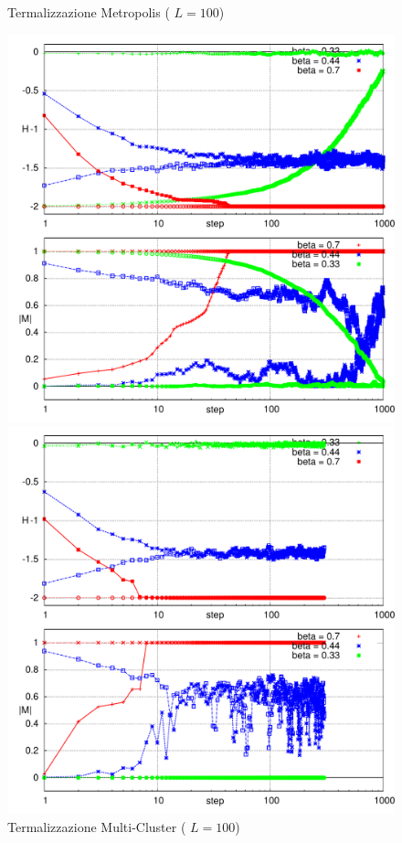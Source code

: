 \begin{figure}[!h]
\centering
\caption[ParteB$\_$Termal$\_$Metro.cpp ]{\footnotesize Termalizzazione Metropolis ( $L=100$)}\label{fig: termo_metro}
\includegraphics[scale=0.65]{Immagini/ParteB/Metro_Termal}
\caption[ParteB$\_$Termal$\_$Cluster.cpp ]{\footnotesize Termalizzazione Multi-Cluster ( $L=100$)}\label{fig: termo_cluster}
\includegraphics[scale=0.65]{Immagini/ParteB/Cluster_Termal}
\end{figure}


